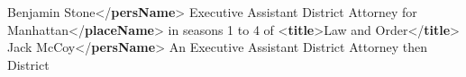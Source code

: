 \begin{shaded}
\hspace*{1em}\hspace*{1em}Benjamin Stone{</\textbf{persName}>}\mbox{}\newline 
\hspace*{1em}\hspace*{1em}Executive Assistant District Attorney for\mbox{}\newline 
\hspace*{1em}\hspace*{1em}Manhattan{</\textbf{placeName}>} in seasons 1 to 4 of {<\textbf{title}>}Law\mbox{}\newline 
\hspace*{1em}\hspace*{1em}\hspace*{1em}\hspace*{1em}\hspace*{1em}\hspace*{1em}\hspace*{1em}\hspace*{1em} and Order{</\textbf{title}>}\mbox{}\newline 
\hspace*{1em}\hspace*{1em}\mbox{}\newline 
\hspace*{1em}\mbox{}\newline 
\hspace*{1em}\mbox{}\newline 
\hspace*{1em}\hspace*{1em}Jack McCoy{</\textbf{persName}>}\mbox{}\newline 
\hspace*{1em}\hspace*{1em}An Executive Assistant District Attorney then District\mbox{}\newline 

\end{shaded}

